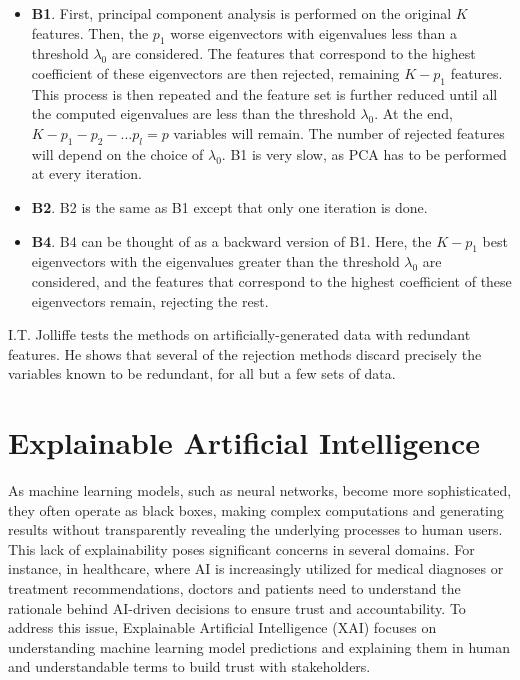 \begin{itemize}
  \item \textbf{B1}. First, principal component analysis is performed on the original $K$ features. Then, the $p_1$ worse eigenvectors with eigenvalues less than a threshold $\lambda_0$ are considered. The features that correspond to the highest coefficient of these eigenvectors are then rejected, remaining $K-p_1$ features. This process is then repeated and the feature set is further reduced until all the computed eigenvalues are less than the threshold $\lambda_0$. At the end, $K - p_1 - p_2 - ... p_l = p$ variables will remain. The number of rejected features will depend on the choice of $\lambda_0$. B1 is very slow, as PCA has to be performed at every iteration.
  \item \textbf{B2}. B2 is the same as B1 except that only one iteration is done.
  \item \textbf{B4}. B4 can be thought of as a backward version of B1. Here, the $K-p_1$ best eigenvectors with the eigenvalues greater than the threshold $\lambda_0$ are considered, and the features that correspond to the highest coefficient of these eigenvectors remain, rejecting the rest.
\end{itemize}

I.T. Jolliffe tests the methods on artificially-generated data with redundant features. He shows that several of the rejection methods discard precisely the variables known to be redundant, for all but a few sets of data.


\section{Explainable Artificial Intelligence}

As machine learning models, such as neural networks, become more sophisticated, they often operate as black boxes, making complex computations and generating results without transparently revealing the underlying processes to human users. This lack of explainability poses significant concerns in several domains. For instance, in healthcare, where AI is increasingly utilized for medical diagnoses or treatment recommendations, doctors and patients need to understand the rationale behind AI-driven decisions to ensure trust and accountability.
To address this issue, Explainable Artificial Intelligence \cite{xai} (XAI) focuses on understanding machine learning model predictions and explaining them in human and understandable terms to build trust with stakeholders.

